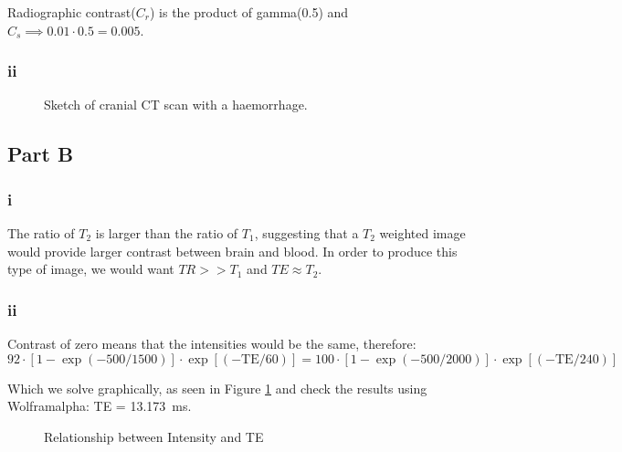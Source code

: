     Radiographic contrast($C_r$) is the product of gamma(0.5) and $C_s \implies 0.01\cdot0.5 = 0.005$.
    \subsubsection*{ii}
    \begin{figure}[h!]
        \centering
        \caption{Sketch of cranial CT scan with a haemorrhage.}
    \end{figure}

\subsection*{Part B}
\subsubsection*{i}
The ratio of $T_2$ is larger than the ratio of $T_1$, suggesting that a $T_2$ weighted image would provide larger contrast between brain and blood. In order to produce this type of image, we would want $TR >> T_1$ and $TE \approx T_2$.

\subsubsection*{ii}
Contrast of zero means that the intensities would be the same, therefore:
\begin{equation*}
        92\cdot[1-\exp(-500/1500)]\cdot\exp[(-\text{TE}/60)] = 100\cdot[1-\exp(-500/2000)]\cdot\exp[(-\text{TE}/240)]
\end{equation*}

Which we solve graphically, as seen in Figure \ref{gr:IntensityxTE} and check the results using Wolframalpha: TE = \SI{13.173}{ms}.

\begin{figure}[h!]
    \centering
    \caption{Relationship between Intensity and TE}
    \label{gr:IntensityxTE}
\end{figure}

